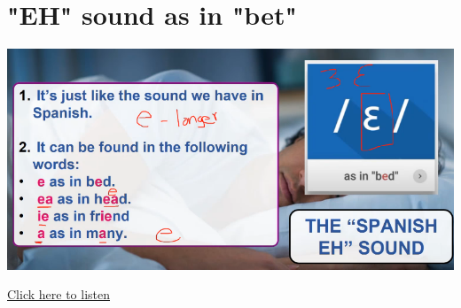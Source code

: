 \section{"EH" sound as in "bet" }
\begin{center}
\includegraphics[width=1\textwidth]{images/eh_portrait.png}
\end{center}

\href{https://drive.google.com/file/d/1OyxdLbyCPaULwdQg9UnMv6D7VTytreMO/view?usp=drive_link}{Click here to listen}

